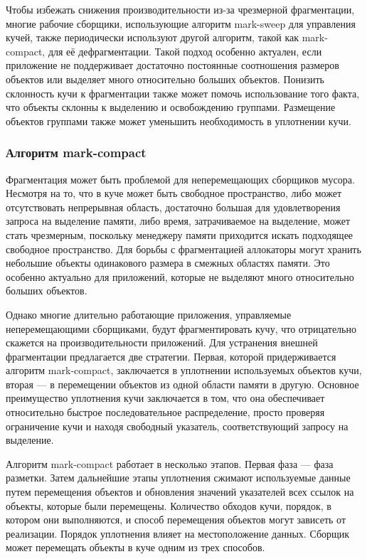 Чтобы избежать снижения производительности из-за чрезмерной фрагментации, многие рабочие сборщики, использующие алгоритм mark-sweep для управления кучей, также периодически используют другой алгоритм, такой как mark-compact, для её дефрагментации. Такой подход особенно актуален, если приложение не поддерживает достаточно постоянные соотношения размеров объектов или выделяет много относительно больших объектов. Понизить склонность кучи к фрагментации также может помочь использование того факта, что объекты склонны к выделению и освобождению группами. Размещение объектов группами также может уменьшить необходимость в уплотнении кучи. \cite{handbook}



\subsubsection{Алгоритм mark-compact}
\label{mark-compact}

Фрагментация может быть проблемой для неперемещающих сборщиков мусора. Несмотря на то, что в куче может быть свободное пространство, либо может отсутствовать непрерывная область, достаточно большая для удовлетворения запроса на выделение памяти, либо время, затрачиваемое на выделение, может стать чрезмерным, поскольку менеджеру памяти приходится искать подходящее свободное пространство. Для борьбы с фрагментацией аллокаторы могут хранить небольшие объекты одинакового размера в смежных областях памяти. Это особенно актуально для приложений, которые не выделяют много относительно больших объектов.  \cite{handbook}

Однако многие длительно работающие приложения, управляемые неперемещающими сборщиками, будут фрагментировать кучу, что отрицательно скажется на производительности приложений. Для устранения внешней фрагментации предлагается две стратегии. Первая, которой придерживается алгоритм mark-compact, заключается в уплотнении используемых объектов кучи, вторая --- в перемещении объектов из одной области памяти в другую. Основное преимущество уплотнения кучи заключается в том, что она обеспечивает относительно быстрое последовательное распределение, просто проверяя ограничение кучи и находя свободный указатель, соответствующий запросу на выделение. \cite{handbook}

Алгоритм mark-compact работает в несколько этапов. Первая фаза --- фаза разметки. Затем дальнейшие
этапы уплотнения сжимают используемые данные путем перемещения объектов и обновления значений указателей всех ссылок на объекты, которые были перемещены. Количество обходов кучи, порядок, в котором они выполняются, и способ перемещения объектов могут зависеть от реализации. Порядок уплотнения влияет на местоположение данных. Сборщик может перемещать объекты в куче одним из трех способов. \cite{handbook}

